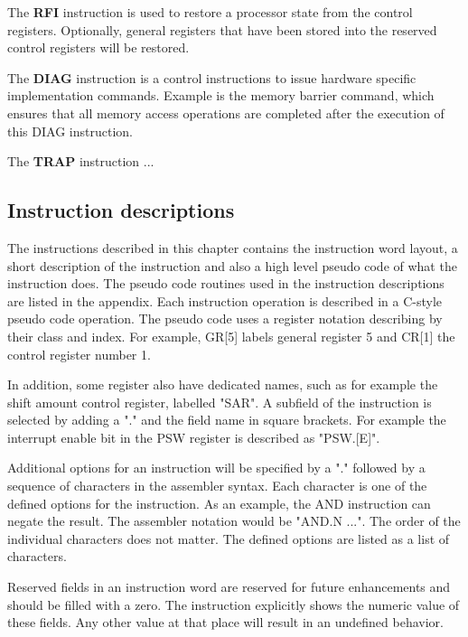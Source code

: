 The \textbf{RFI} instruction is used to restore a processor state from the control registers. Optionally, general registers that have been stored into the reserved control registers will be restored.

The \textbf{DIAG} instruction is a control instructions to issue hardware specific implementation commands. Example is the memory barrier command, which ensures that all memory access operations are completed after the execution of this DIAG instruction. 

The \textbf{TRAP} instruction ...

\subsection*{Instruction descriptions}

The instructions described in this chapter contains the instruction word layout, a short description of the instruction and also a high level pseudo code of what the instruction does. The pseudo code routines used in the instruction descriptions are listed in the appendix. Each instruction operation is described in a C-style pseudo code operation. The pseudo code uses a register notation describing by their class and index. For example, GR[5] labels general register 5 and CR[1] the control register number 1. 

In addition, some register also have dedicated names, such as for example the shift amount control register, labelled "SAR". A subfield of the instruction is selected by adding a "." and the field name in square brackets. For example the interrupt enable bit in the PSW register is described as "PSW.[E]". 

Additional options for an instruction will be specified by a "." followed by a sequence of characters in the assembler syntax. Each character is one of the defined options for the instruction. As an example, the AND instruction can negate the result. The assembler notation would be "AND.N ...". The order of the individual characters does not matter. The defined options are listed as a list of characters.

Reserved fields in an instruction word are reserved for future enhancements and should be filled with a zero. The instruction explicitly shows the numeric value of these fields. Any other value at that place will result in an undefined behavior.

